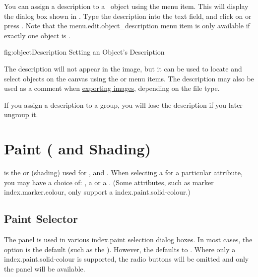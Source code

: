 You can assign a description to a \selected\ \gls*{object} using the
 menu item. This will display the
dialog box shown in . Type the
description into the text field, and click on  or press
.  Note that the \gls{menu.edit.object_description}
menu item is only available if exactly one object is \selected.

\FloatFig
  {fig:objectDescription}
  {}
  {Setting an Object's Description}

The description will not appear in the image, but it can be used to
locate and select \glspl*{object} on the canvas using the
 or
 menu items. The description
may also be used as a comment when
\hyperref[sec:exportimage]{exporting images}, depending on the
file type.

\begin{important}
If you assign a description to a \gls{group},
you will lose the description if you later ungroup it.
\end{important}

\chapter{Paint ( and Shading)}
\label{sec:paintcolourandshading}

 is the  or
 (shading) used for
,  and . When selecting a
 for a particular attribute, you may have a choice of:
, a  or a .
(Some attributes, such as marker \gls{index.marker.colour},
only support a \gls{index.paint.solid-colour}.)

\section{Paint Selector}\label{sec:paint}


The  panel is used in various \gls{index.paint}
selection dialog boxes.
In most cases, the  option is the default
(such as the ).  However, the
 defaults to .
Where only a \gls{index.paint.solid-colour} is supported, the radio
buttons will be omitted and only the  panel
will be available.

